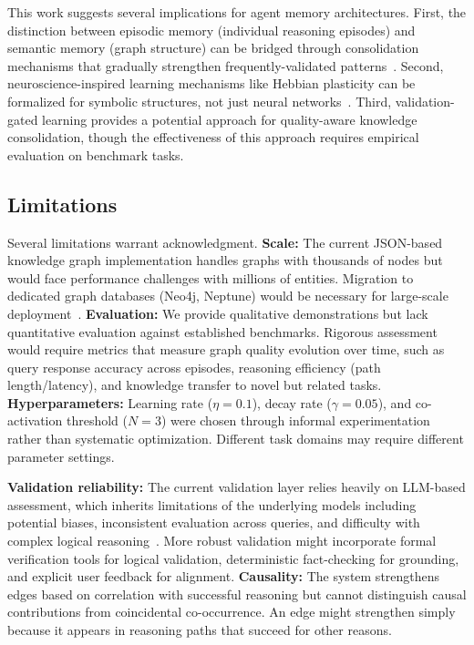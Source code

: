 \documentclass{article}
\begin{document}
This work suggests several implications for agent memory architectures. First, the distinction between episodic memory (individual reasoning episodes) and semantic memory (graph structure) can be bridged through consolidation mechanisms that gradually strengthen frequently-validated patterns~\citep{squire2015memory}. Second, neuroscience-inspired learning mechanisms like Hebbian plasticity can be formalized for symbolic structures, not just neural networks~\citep{mvil2024hebbian}. Third, validation-gated learning provides a potential approach for quality-aware knowledge consolidation, though the effectiveness of this approach requires empirical evaluation on benchmark tasks.

\subsection{Limitations}

Several limitations warrant acknowledgment. \textbf{Scale:} The current JSON-based knowledge graph implementation handles graphs with thousands of nodes but would face performance challenges with millions of entities. Migration to dedicated graph databases (Neo4j, Neptune) would be necessary for large-scale deployment~\citep{edge2024graphrag}. \textbf{Evaluation:} We provide qualitative demonstrations but lack quantitative evaluation against established benchmarks. Rigorous assessment would require metrics that measure graph quality evolution over time, such as query response accuracy across episodes, reasoning efficiency (path length/latency), and knowledge transfer to novel but related tasks. \textbf{Hyperparameters:} Learning rate ($\eta = 0.1$), decay rate ($\gamma = 0.05$), and co-activation threshold ($N = 3$) were chosen through informal experimentation rather than systematic optimization. Different task domains may require different parameter settings.

\textbf{Validation reliability:} The current validation layer relies heavily on LLM-based assessment, which inherits limitations of the underlying models including potential biases, inconsistent evaluation across queries, and difficulty with complex logical reasoning~\citep{pan2024unifying}. More robust validation might incorporate formal verification tools for logical validation, deterministic fact-checking for grounding, and explicit user feedback for alignment. \textbf{Causality:} The system strengthens edges based on correlation with successful reasoning but cannot distinguish causal contributions from coincidental co-occurrence. An edge might strengthen simply because it appears in reasoning paths that succeed for other reasons.
\end{document}
